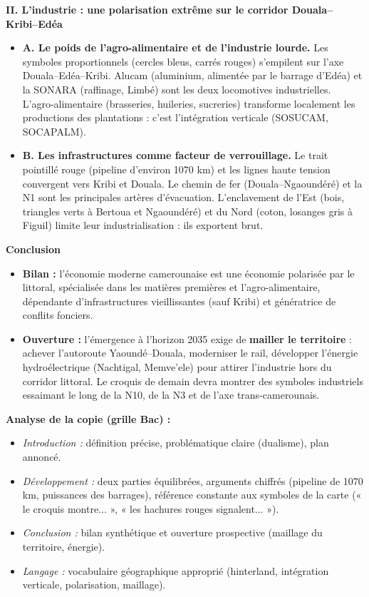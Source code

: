 \documentclass[11pt]{article}
\begin{document}
\begin{exoresolu}
\textbf{II. L'industrie : une polarisation extrême sur le corridor Douala--Kribi--Edéa}
\begin{itemize}
    \item \textbf{A. Le poids de l'agro-alimentaire et de l'industrie lourde.} Les symboles proportionnels (cercles bleus, carrés rouges) s'empilent sur l'axe Douala--Edéa--Kribi. Alucam (aluminium, alimentée par le barrage d'Edéa) et la SONARA (raffinage, Limbé) sont les deux locomotives industrielles. L'agro-alimentaire (brasseries, huileries, sucreries) transforme localement les productions des plantations : c'est l'intégration verticale (SOSUCAM, SOCAPALM).
    \item \textbf{B. Les infrastructures comme facteur de verrouillage.} Le trait pointillé rouge (pipeline d'environ \num{1070} km) et les lignes haute tension convergent vers Kribi et Douala. Le chemin de fer (Douala--Ngaoundéré) et la N1 sont les principales artères d'évacuation. L'enclavement de l'Est (bois, triangles verts à Bertoua et Ngaoundéré) et du Nord (coton, losanges gris à Figuil) limite leur industrialisation : ils exportent brut.
\end{itemize}

\textbf{Conclusion}
\begin{itemize}
    \item \textbf{Bilan :} l'économie moderne camerounaise est une économie polarisée par le littoral, spécialisée dans les matières premières et l'agro-alimentaire, dépendante d'infrastructures vieillissantes (sauf Kribi) et génératrice de conflits fonciers.
    \item \textbf{Ouverture :} l'émergence à l'horizon 2035 exige de \textbf{mailler le territoire} : achever l'autoroute Yaoundé--Douala, moderniser le rail, développer l'énergie hydroélectrique (Nachtigal, Memve'ele) pour attirer l'industrie hors du corridor littoral. Le croquis de demain devra montrer des symboles industriels essaimant le long de la N10, de la N3 et de l'axe trans-camerounais.
\end{itemize}
\tcblower
\textbf{Analyse de la copie (grille Bac) :}
\begin{itemize}
    \item \textit{Introduction :} définition précise, problématique claire (dualisme), plan annoncé.
    \item \textit{Développement :} deux parties équilibrées, arguments chiffrés (pipeline de \num{1070} km, puissances des barrages), référence constante aux symboles de la carte (« le croquis montre... », « les hachures rouges signalent... »).
    \item \textit{Conclusion :} bilan synthétique et ouverture prospective (maillage du territoire, énergie).
    \item \textit{Langage :} vocabulaire géographique approprié (hinterland, intégration verticale, polarisation, maillage).
\end{itemize}
\end{exoresolu}
\end{document}
